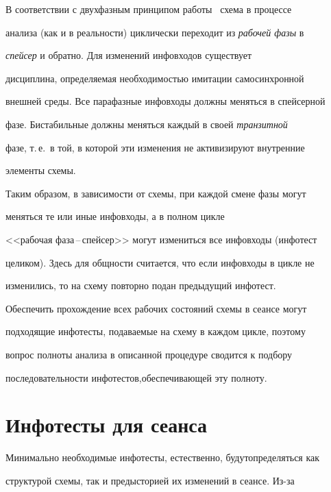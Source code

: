 В соответствии с двухфазным принципом работы~\cite{1-4} схема в процессе 


анализа (как и в реальности) циклически переходит из \textit{рабочей фазы} в 


\textit{спейсер} и обратно. Для изменений инфовходов существует 


дисциплина, определяемая необходимостью имитации самосинхронной 


внешней среды. Все парафазные инфовходы должны меняться в спейсерной 


фазе. Бистабильные должны меняться каждый в своей \textit{транзитной} 


фазе, т.\,е.\ в той, в которой эти изменения не активизируют внутренние 


элементы схемы.





Таким образом, в зависимости от схемы, при каждой смене фазы могут 


меняться те или иные инфовходы, а в полном цик\-ле 


<<рабочая фаза\,--\,спейсер>> могут измениться все инфовходы (инфотест 


целиком). Здесь для общности считается, что если инфовходы в цик\-ле не 


изменились, то на схему повторно подан предыдущий инфотест.





Обеспечить прохождение всех рабочих состояний схемы в се\-ансе могут 


подходящие инфотесты, подаваемые на схему в каж\-дом цикле, поэтому 


вопрос полноты анализа в описанной про\-цедуре сводится к подбору 


последовательности инфотестов,\linebreak обеспечивающей эту полноту.





\section{Инфотесты для сеанса}





Минимально необходимые инфотесты, естественно, будут\linebreak определяться как 


структурой схемы, так и предысторией их изменений в сеансе. Из-за 


